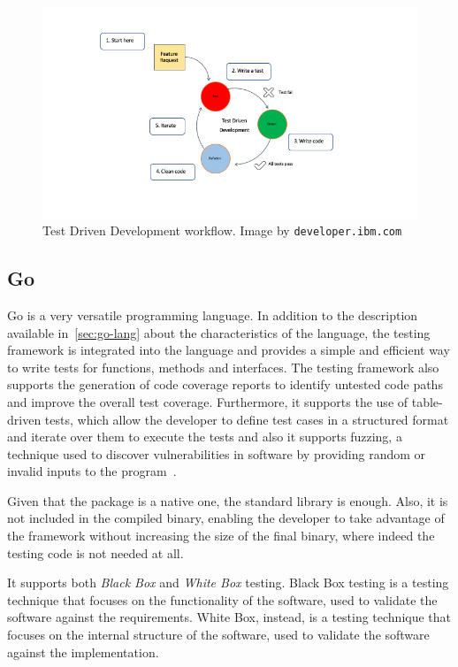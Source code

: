 \begin{figure}[t]
  \centering
  \includegraphics[width=1.0\textwidth]{chapters/06/assets/tdd}
  \caption[Test Driven Development workflow]{Test Driven Development workflow. Image by \texttt{developer.ibm.com}}
  \label{fig:tdd}
\end{figure}

\subsection{Go}

Go is a very versatile programming language. In addition to the description available in~\cref{sec:go-lang} about the characteristics of the language, the testing framework is integrated into the language and provides a simple and efficient way to write tests for functions, methods and interfaces. The testing framework also supports the generation of code coverage reports to identify untested code paths and improve the overall test coverage. Furthermore, it supports the use of table-driven tests, which allow the developer to define test cases in a structured format and iterate over them to execute the tests and also it supports fuzzing, a technique used to discover vulnerabilities in software by providing random or invalid inputs to the program~\cite{go-package-testing}.

Given that the package is a native one, the standard library is enough. Also, it is not included in the compiled binary, enabling the developer to take advantage of the framework without increasing the size of the final binary, where indeed the testing code is not needed at all.

It supports both \textit{Black Box} and \textit{White Box} testing. Black Box testing is a testing technique that focuses on the functionality of the software, used to validate the software against the requirements. White Box, instead, is a testing technique that focuses on the internal structure of the software, used to validate the software against the implementation.

